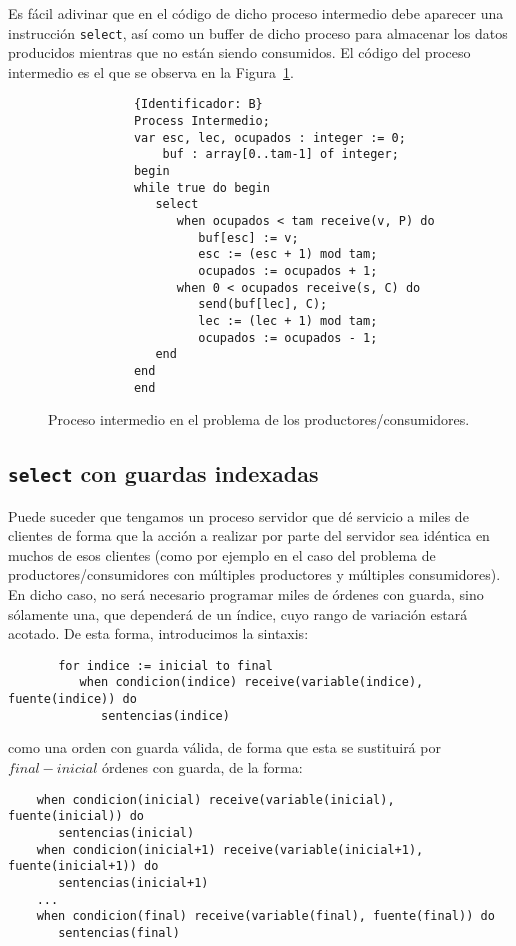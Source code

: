 \begin{ejemplo}
    Es fácil adivinar que en el código de dicho proceso intermedio debe aparecer una instrucción \verb|select|, así como un buffer de dicho proceso para almacenar los datos producidos mientras que no están siendo consumidos. El código del proceso intermedio es el que se observa en la Figura~\ref{fig:prod_cons_intermedio}.
    \begin{figure}[H]
        \centering
        \begin{verbatim}
            {Identificador: B}
            Process Intermedio;
            var esc, lec, ocupados : integer := 0;
                buf : array[0..tam-1] of integer;
            begin
            while true do begin
               select
                  when ocupados < tam receive(v, P) do
                     buf[esc] := v;
                     esc := (esc + 1) mod tam;
                     ocupados := ocupados + 1;
                  when 0 < ocupados receive(s, C) do
                     send(buf[lec], C);
                     lec := (lec + 1) mod tam;
                     ocupados := ocupados - 1;
               end
            end
            end
        \end{verbatim}
        \caption{Proceso intermedio en el problema de los productores/consumidores.}
        \label{fig:prod_cons_intermedio}
    \end{figure}
\end{ejemplo}

\subsection{\texttt{select} con guardas indexadas}
Puede suceder que tengamos un proceso servidor que dé servicio a miles de clientes de forma que la acción a realizar por parte del servidor sea idéntica en muchos de esos clientes (como por ejemplo en el caso del problema de productores/consumidores con múltiples productores y múltiples consumidores).\\

En dicho caso, no será necesario programar miles de órdenes con guarda, sino sólamente una, que dependerá de un índice, cuyo rango de variación estará acotado. De esta forma, introducimos la sintaxis:
\begin{verbatim}
       for indice := inicial to final
          when condicion(indice) receive(variable(indice), fuente(indice)) do
             sentencias(indice)
\end{verbatim}
como una orden con guarda válida, de forma que esta se sustituirá por $final-inicial$ órdenes con guarda, de la forma:
\begin{verbatim}
    when condicion(inicial) receive(variable(inicial), fuente(inicial)) do
       sentencias(inicial)
    when condicion(inicial+1) receive(variable(inicial+1), fuente(inicial+1)) do
       sentencias(inicial+1)
    ...
    when condicion(final) receive(variable(final), fuente(final)) do
       sentencias(final)
\end{verbatim}


